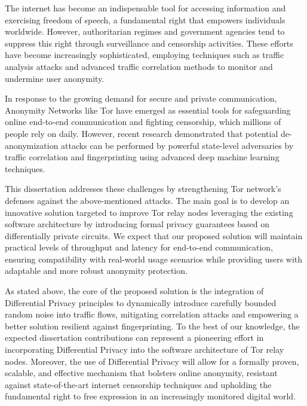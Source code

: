 
%

The internet has become an indispensable tool for accessing information and exercising freedom of speech, a fundamental right that empowers individuals worldwide. However, authoritarian regimes and government agencies tend to suppress this right through surveillance and censorship activities. These efforts have become increasingly sophisticated, employing techniques such as traffic analysis attacks and advanced traffic correlation methods to monitor and undermine user anonymity.

In response to the growing demand for secure and private communication, Anonymity Networks like Tor have emerged as essential tools for safeguarding online end-to-end communication and fighting censorship, which millions of people rely on daily. However, recent research demonstrated that potential de-anonymization attacks can be performed by powerful state-level adversaries by traffic correlation and fingerprinting using advanced deep machine learning techniques.

This dissertation addresses these challenges by strengthening Tor network's defenses against the above-mentioned attacks. The main goal is to develop an innovative solution targeted to improve Tor relay nodes leveraging the existing software architecture by introducing formal privacy guarantees based on differentially private circuits. We expect that our proposed solution will maintain practical levels of throughput and latency for end-to-end communication, ensuring compatibility with real-world usage scenarios while providing users with adaptable and more robust anonymity protection.

As stated above, the core of the proposed solution is the integration of Differential Privacy principles to dynamically introduce carefully bounded random noise into traffic flows, mitigating correlation attacks and empowering a better solution resilient against fingerprinting. 
To the best of our knowledge, the expected dissertation contributions can represent a pioneering effort in incorporating Differential
Privacy into the software architecture of Tor relay nodes. Moreover, the use of Differential Privacy will allow for a formally proven, scalable, and effective mechanism that bolsters online anonymity, resistant against state-of-the-art internet censorship techniques and upholding the fundamental right to free expression in an increasingly monitored digital world.

